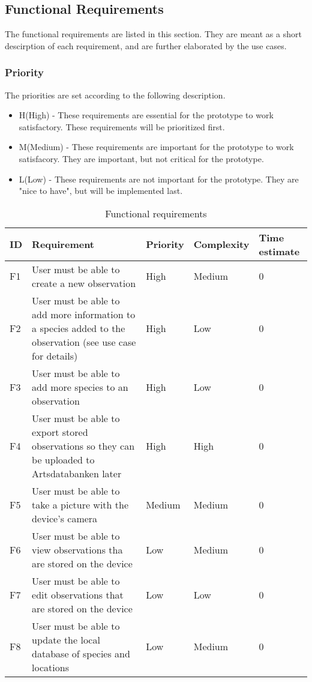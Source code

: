 \subsection{Functional Requirements}
The functional requirements are listed in this section. They are meant as a short descirption of each requirement, and are further elaborated by the use cases.

\subsubsection{Priority}
The priorities are set according to the following description.
\begin{itemize}
	 \item H(High) - These requirements are essential for the prototype to work satisfactory. These requirements will be prioritized first.
	\item M(Medium) - These requirements are important for the prototype to work satisfacory. They are important, but not critical for the prototype.
	\item L(Low) - These requirements are not important for the prototype. They are "nice to have", but will be implemented last.
\end{itemize}

\begin{table}
	\begin{tabular}[t]{|l|p{}|l|l|p{}|}\hline
	\bf ID&\bf Requirement& \bf Priority& \bf Complexity&\bf Time estimate\\\hline
	F1&User must be able to create a new observation &High&Medium&0\\\hline
	F2&User must be able to add more information to a species added to the observation (see use case for details) 	&High&Low&0\\\hline
	F3&User must be able to add more species to an observation &High&Low&0\\\hline
	F4&User must be able to export stored observations so they can be uploaded to Artsdatabanken later &High&High&0\\\hline
	F5&User must be able to take a picture with the device's camera &Medium&Medium&0\\\hline
	F6&User must be able to view observations tha are stored on the device &Low&Medium&0\\\hline
	F7&User must be able to edit observations that are stored on the device &Low&Low&0\\\hline
	F8&User must be able to update the local database of species and locations &Low&Medium&0\\\hline
	\end{tabular}
	\caption{Functional requirements}
	\label{funcreqs}
\end{table}